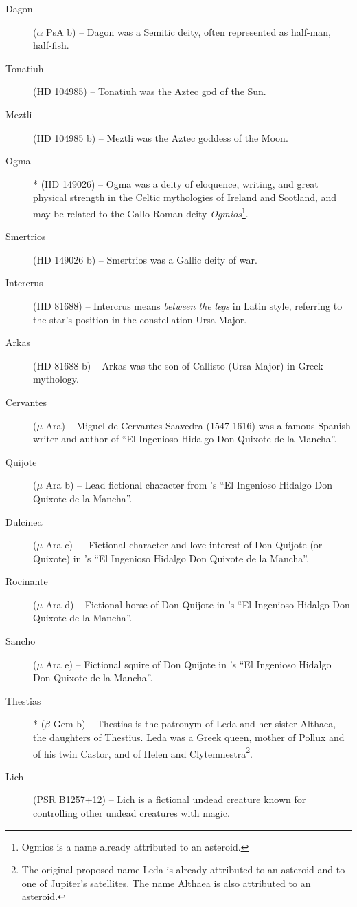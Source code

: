 \begin{description}
\item[Dagon] ($\alpha$ PsA b) -- Dagon was a Semitic deity, often represented as half-man, half-fish.
\item[Tonatiuh] (HD 104985) -- Tonatiuh was the Aztec god of the Sun.
\item[Meztli] (HD 104985 b) -- Meztli was the Aztec goddess of the Moon.
\item[Ogma]* (HD 149026) -- Ogma was a deity of eloquence, writing, and great physical strength in the Celtic mythologies of Ireland and Scotland, and may be related to the Gallo-Roman deity \textit{Ogmios}\footnote{Ogmios is a name already attributed to an asteroid.}.
\item[Smertrios] (HD 149026 b) -- Smertrios was a Gallic deity of war.
\item[Intercrus] (HD 81688) -- Intercrus means \textit{between the legs} in Latin style, referring to the star's position in the constellation Ursa Major.
\item[Arkas] (HD 81688 b) -- Arkas was the son of Callisto (Ursa Major) in Greek mythology.
\item[Cervantes] ($\mu$ Ara) -- Miguel de Cervantes Saavedra (1547-1616) was a famous Spanish writer and author of ``El Ingenioso Hidalgo Don Quixote de la Mancha''.
\item[Quijote] ($\mu$ Ara b) -- Lead fictional character from 's ``El Ingenioso Hidalgo Don Quixote de la Mancha''.
\item[Dulcinea]($\mu$ Ara c) — Fictional character and love interest of Don Quijote (or Quixote) in 's ``El Ingenioso Hidalgo Don Quixote de la Mancha''.
\item[Rocinante] ($\mu$ Ara d) -- Fictional horse of Don Quijote in 's ``El Ingenioso Hidalgo Don Quixote de la Mancha''.
\item[Sancho] ($\mu$ Ara e) -- Fictional squire of Don Quijote in 's ``El Ingenioso Hidalgo Don Quixote de la Mancha''.
\item[Thestias]* ($\beta$ Gem b) -- Thestias is the patronym of Leda and her sister Althaea, the daughters of Thestius. Leda was a Greek queen, mother of Pollux and of his twin Castor, and of Helen and Clytemnestra\footnote{The original proposed name Leda is already attributed to an asteroid and to one of Jupiter's satellites. The name Althaea is also attributed to an asteroid.}.
\item[Lich] (PSR B1257+12) -- Lich is a fictional undead creature known for controlling other undead creatures with magic.

\end{description}

